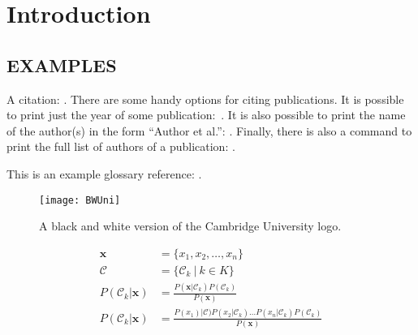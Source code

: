 \chapter{Introduction}
\section{EXAMPLES}
A citation: \cite{example}. There are some handy options for citing publications. It is possible to print just the year of some publication:~\citeyear{example}. It is also possible to print the name of the author(s) in the form ``Author et al.'': \citeauthor{example}. Finally, there is also a command to print the full list of authors of a publication: \citet*{example}.

This is an example glossary reference: . \\


\begin{figure}[ht]
    \centering
    \texttt{[image: BWUni]}
    \caption[Cambridge University BW Logo]{A black and white version of the Cambridge University logo.}
    \label{fig:bwUniLogo}
\end{figure}

\begin{align}
\boldsymbol{x} &= \{x_1, x_2, \dots, x_n\} \\
\mathcal{C} &= \{\mathcal{C}_k \: | \: k \in K \} \\
P(\mathcal{C}_k|\boldsymbol{x}) &= \frac{P(\boldsymbol{x} |\mathcal{C}_k) P(\mathcal{C}_k)} {P(\boldsymbol{x})} \\
P(\mathcal{C}_k|\boldsymbol{x}) &= \frac{P(x_1) |\mathcal{C})
                                   P(x_2 |\mathcal{C}_k) \dots
                                   P(x_n |\mathcal{C}_k)
                                   P(\mathcal{C}_k)}{ P(\boldsymbol{x})} \\
\end{align}

